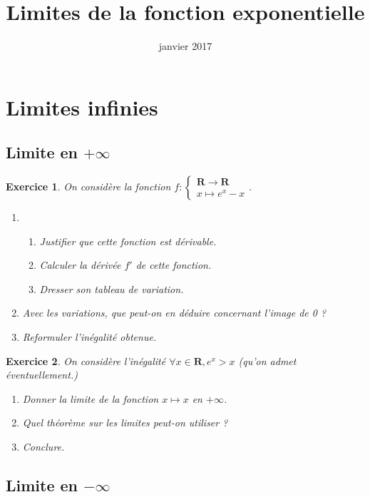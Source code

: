 \documentclass[12pt,a4paper,french]{article}
\title{Limites de la fonction exponentielle}
\author{\bsc{Jumel}}
\date{janvier 2017}
\makeatletter
\renewcommand{\maketitle}%
{\framebox{%
    \begin{minipage}{1.0\linewidth}%
      \begin{center}%
        \Large \@title ~-- \@author \\%
        \@date%
      \end{center}%
    \end{minipage}}%
  \normalsize%
}
\newcommand{\R}{\mathbf{R}}
\theoremstyle{break}
\theoremstyle{plain}
\newtheorem{exerciceT}{Exercice}
\theoremstyle{nonumberplain}
\theoremstyle{nonumberbreak}
\newenvironment{exercice}{\begin{framed}\begin{exerciceT}}{\end{exerciceT}\end{framed}}
\makeatother
\begin{document}
\maketitle

\section{Limites infinies}

\subsection{Limite en $+\infty$}

\begin{exercice}
  On considère la fonction
  $f:\left\lbrace\begin{matrix}\R\to\R\\x\mapsto e^x -
  x\end{matrix}\right.$.
  \begin{enumerate}
    \item
      \begin{enumerate}
        \item Justifier que cette fonction est dérivable.
        \item Calculer la dérivée $f'$ de cette fonction.
        \item Dresser son tableau de variation.
      \end{enumerate}
    \item Avec les variations, que peut-on en déduire concernant l'image
      de 0 ?
    \item Reformuler l'inégalité obtenue.
  \end{enumerate}
\end{exercice}

\begin{exercice}
  On considère l'inégalité $\forall x\in \R, e^x > x$ (qu'on admet
  éventuellement.)

  \begin{enumerate}
    \item Donner la limite de la fonction $x\mapsto x$ en $+\infty$.
    \item Quel théorème sur les limites peut-on utiliser ?
    \item Conclure.
  \end{enumerate}
\end{exercice}

\subsection{Limite en $-\infty$}
\end{document}
